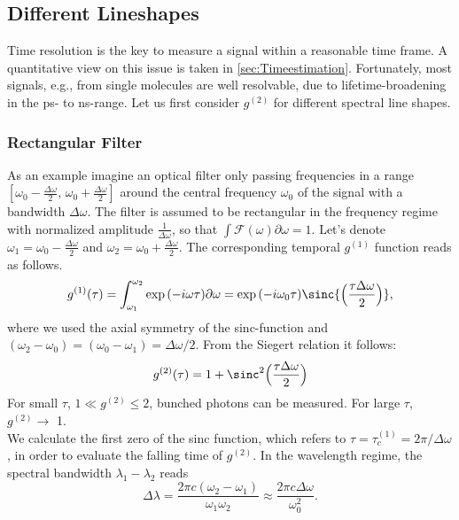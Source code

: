 \subsection{Different Lineshapes}\label{sec:lineshapes}
Time resolution is the key to measure a signal within a reasonable time frame. A quantitative view on this issue is taken in \cref{sec:Timeestimation}.
Fortunately, most signals, e.g., from single molecules are well resolvable, due to lifetime-broadening in the \si{\ps}- to \si{\ns}-range. Let us first consider $g^{(2)}$ for different spectral line shapes.
\subsubsection{Rectangular Filter}
As an example imagine an optical filter only passing frequencies in a range $[\omega_0-\frac{\Delta\omega}{2},\,\omega_0+\frac{\Delta\omega}{2}]$ around the central frequency $\omega_0$ of the signal with a bandwidth $\Delta\omega$. The filter is assumed to be rectangular in the frequency regime with normalized amplitude $\frac{1}{\Delta\omega}$, so that $\int \mathcal{F}(\omega)\partial\omega=1$. Let’s denote $\omega_{1}=\omega_0-\frac{\Delta\omega}{2}$ and $\omega_{2}=\omega_0+\frac{\Delta\omega}{2}$. The corresponding temporal $g^{(1)}$ function reads as follows.
\begin{equation}\label{eq:KhinchinExample11}
	g^{(1)}(\tau)=\int_{\omega_{1}}^{\omega_{2}}\exp{(-i\omega \tau)}\partial\omega=\exp{(-i\omega_0\tau)}\sinc{\Big(\dfrac{\tau\Delta\omega}{2}\Big)},
\end{equation}
where we used the axial symmetry of the sinc-function and $(\omega_2-\omega_0)=(\omega_0-\omega_1)=\Delta\omega/2$.
From the Siegert relation it follows:
\begin{equation}\label{Eq:KhinchinExample12}
	g^{(2)}(\tau)=1+\sinc^2{\Big(\dfrac{\tau\Delta\omega}{2}\Big)}
\end{equation}
For small $\tau$, $1\ll g^{(2)}\leq2$, bunched photons can be measured. For large $\tau$, $g^{(2)}\rightarrow$ \num{1}.\\
We calculate the first zero of the sinc function, which refers to $\tau=\tau_c^{(1)}=2\pi/\Delta\omega$, in order to evaluate the falling time of $g^{(2)}$.
In the wavelength regime, the spectral bandwidth $\lambda_1-\lambda_2$ reads
\begin{equation}\label{eq:KhinchinExample13}
	\Delta\lambda=\dfrac{2\pi c(\omega_2-\omega_1)}{\omega_1\omega_2}\approx\dfrac{2\pi c\Delta\omega}{\omega^2_0}.
\end{equation}
